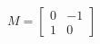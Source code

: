 \documentclass[preview]{standalone}
\begin{document}
\begin{align*}
M = \begin{bmatrix} 0 & -1 \\ 1 & 0 \end{bmatrix}
\end{align*}
\end{document}
